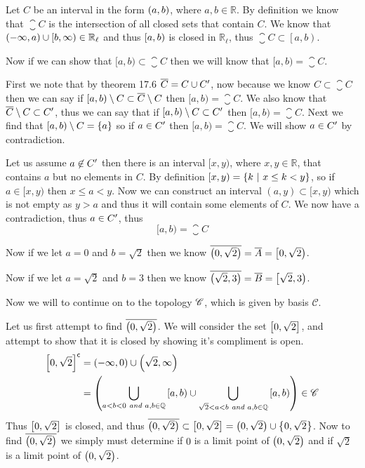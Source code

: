 \documentclass{article}
\begin{document}
Let $C$ be an interval in the form $\left( {a} , {b} \right)$, where $a,b\in\mathbb R$. By definition we know that $\closure C $ is the intersection of all closed sets that contain $C$. We know that $\left( {-\infty} , {a} \right)\cup\left[ {b} , {\infty} \right) \in \mathbb R_\ell$ and thus $\left[ {a} , {b} \right)$ is closed in $\mathbb R_\ell$, thus $\closure C \subset \left[a,b\right)$.

Now if we can show that $[a,b)\subset\closure C$ then we will know that $[a,b)=\closure C$.

First we note that by theorem 17.6 $\overline C = C \cup {C} '$, now because we know $C \subset \closure C$ then we can say if $\left[ {a} , {b} \right)\setminus C\subset \overline C \setminus C$ then $ [a,b) = \closure C$. We also know that $\overline C \setminus C \subset {C} '$, thus we can say that if $\left[ {a} , {b} \right) \setminus C \subset {C} '$ then $[a,b) = \closure C$. Next we find that $[a,b) \setminus C = \left\{ {a} \right\}$ so if $a \in {C} '$ then $[a,b) = \closure C$. We will show $a\in{C} '$ by contradiction.

Let us assume $a \not\in{C} '$ then there is an interval $[x,y)$, where $x,y\in \mathbb R$, that contains $a$ but no elements in $C$. By definition $[x,y) = \left\{ {{k} \ |\  {x\le k<y}} \right\}$, so if $a\in[x,y)$ then $x\le a<y$. Now we can construct an interval $(a,y) \subset [x,y)$ which is not empty as $y > a$ and thus it will contain some elements of $C$. We now have a contradiction, thus $a \in {C} '$, thus
\[
[a,b) = \closure C
\]

Now if we let $a = 0$ and $b = \sqrt2$ then we know $\overline{\left( {0} , {\sqrt2} \right)} = \overline A = \left[ {0} , {\sqrt2} \right)$.

Now if we let $a = \sqrt2$ and $b = 3$ then we know $\overline{\left( {\sqrt2} , {3} \right)} = \overline B = \left[ {\sqrt2} , {3} \right)$.
\medskip

Now we will to continue on to the topology $\mathscr C$, which is given by basis $\mathscr C$.

Let us first attempt to find $\overline{\left( {0} , {\sqrt2} \right)}$. We will consider the set $\left[ {0} , {\sqrt2} \right]$, and attempt to show that it is closed by showing it's compliment is open.
\begin{align*}
{\left[ {0} , {\sqrt2} \right]}^{\mathsf{c}} &= \left( {-\infty} , {0} \right) \cup \left( {\sqrt2} , {\infty} \right) \\
&= \left(\bigcup\limits_{a<b<0 \textit{ and } a,b \in \mathbb Q}^{}  {\left[ {a} , {b} \right)}  \cup \bigcup\limits_{\sqrt2<a<b \textit{ and } a,b \in \mathbb Q}^{}  {\left[ {a} , {b} \right)} \right) \in \mathscr C
\end{align*}
Thus $\left[ {0} , {\sqrt2} \right]$ is closed, and thus $\overline{\left( {0} , {\sqrt2} \right)}\subset\left[ {0} , {\sqrt2} \right]=\left( {0} , {\sqrt2} \right)\cup\left\{ {0,\sqrt2} \right\}$. Now to find $\overline{\left( {0} , {\sqrt2} \right)}$ we simply must determine if $0$ is a limit point of $\left( {0} , {\sqrt2} \right)$ and if $\sqrt2$ is a limit point of $\left( {0} , {\sqrt2} \right)$.
\end{document}
